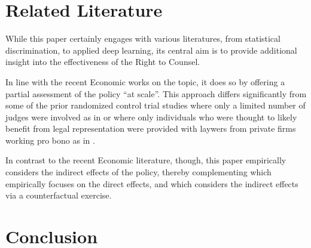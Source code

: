 \documentclass[a4paper,12pt]{article}
\begin{document}
\section{Related Literature}
 While this paper certainly engages with various literatures, from statistical discrimination, to applied deep learning, its central aim is to provide additional insight into the effectiveness of the Right to Counsel. \par 
 In line with the recent Economic works on the topic, it does so by offering a partial assessment of the policy ``at scale''. This approach differs significantly from some of the prior randomized control trial studies where only a limited number of judges were involved as in \cite{greiner2012limits} or where only individuals who were thought to likely benefit from legal representation were provided with laywers from private firms working pro bono as in \cite{seron2001impact}.   

In contrast to the recent Economic literature, though, this paper empirically considers the indirect effects of the policy, thereby complementing \cite{cassidy2022effects} which empirically focuses on the direct effects, and \cite{abramson2021welfare} which considers the indirect effects via a counterfactual exercise.
\section{Conclusion}


\end{document}
